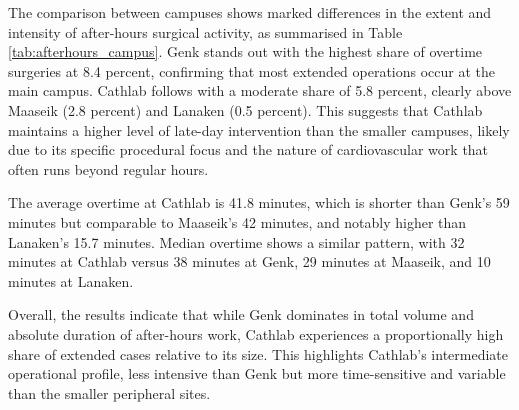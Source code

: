 \documentclass[
]{article}
\begin{document}
The comparison between campuses shows marked differences in the extent
and intensity of after-hours surgical activity, as summarised in Table
\ref{tab:afterhours_campus}. Genk stands out with the highest share of
overtime surgeries at 8.4 percent, confirming that most extended
operations occur at the main campus. Cathlab follows with a moderate
share of 5.8 percent, clearly above Maaseik (2.8 percent) and Lanaken
(0.5 percent). This suggests that Cathlab maintains a higher level of
late-day intervention than the smaller campuses, likely due to its
specific procedural focus and the nature of cardiovascular work that
often runs beyond regular hours.

The average overtime at Cathlab is 41.8 minutes, which is shorter than
Genk's 59 minutes but comparable to Maaseik's 42 minutes, and notably
higher than Lanaken's 15.7 minutes. Median overtime shows a similar
pattern, with 32 minutes at Cathlab versus 38 minutes at Genk, 29
minutes at Maaseik, and 10 minutes at Lanaken.

Overall, the results indicate that while Genk dominates in total volume
and absolute duration of after-hours work, Cathlab experiences a
proportionally high share of extended cases relative to its size. This
highlights Cathlab's intermediate operational profile, less intensive
than Genk but more time-sensitive and variable than the smaller
peripheral sites.
\end{document}
